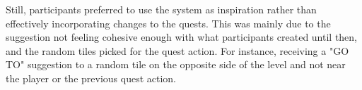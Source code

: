 Still, participants preferred to use the system as inspiration rather than effectively incorporating changes to the quests. This was mainly due to the suggestion not feeling cohesive enough with what participants created until then, and the random tiles picked for the quest action. For instance, receiving a "GO TO" suggestion to a random tile on the opposite side of the level and not near the player or the previous quest action.








